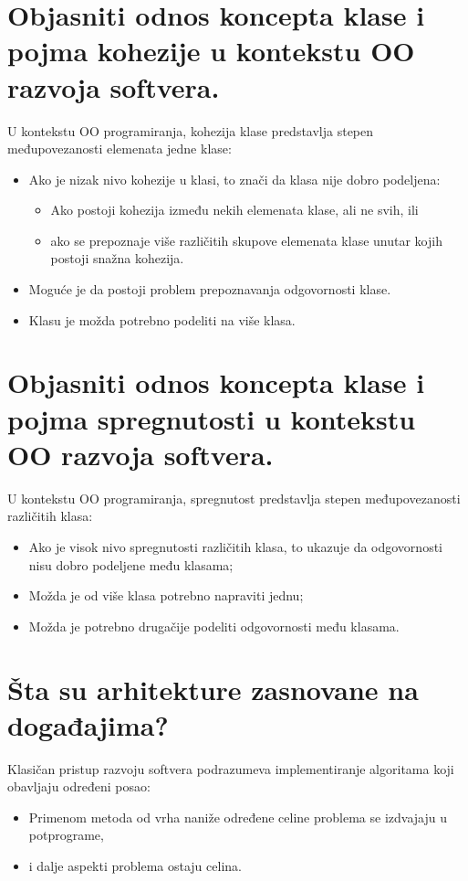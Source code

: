 \documentclass[a4paper]{article}
\begin{document}
\section{Objasniti odnos koncepta klase i pojma kohezije u kontekstu OO razvoja softvera.}
  U kontekstu OO programiranja, kohezija klase predstavlja stepen međupovezanosti elemenata jedne klase:
  \begin{itemize}
    \item Ako je nizak nivo kohezije u klasi, to znači da klasa nije dobro podeljena:
          \begin{itemize}
            \item Ako postoji kohezija između nekih elemenata klase, ali ne svih, ili
            \item ako se prepoznaje više različitih skupove elemenata klase unutar kojih postoji snažna kohezija.
          \end{itemize}
    \item Moguće je da postoji problem prepoznavanja odgovornosti klase. 
    \item Klasu je možda potrebno podeliti na više klasa.
  \end{itemize}

\section{Objasniti odnos koncepta klase i pojma spregnutosti u kontekstu OO razvoja softvera.}
  U kontekstu OO programiranja, spregnutost predstavlja stepen međupovezanosti različitih klasa:
  \begin{itemize}
    \item Ako je visok nivo spregnutosti različitih klasa, 
          to ukazuje da odgovornosti nisu dobro podeljene među klasama;
    \item Možda je od više klasa potrebno napraviti jednu;
    \item Možda je potrebno drugačije podeliti odgovornosti među klasama.
  \end{itemize}

\section{Šta su arhitekture zasnovane na događajima?}
  Klasičan pristup razvoju softvera podrazumeva implementiranje algoritama 
  koji obavljaju određeni posao:
  \begin{itemize}
    \item Primenom metoda od vrha naniže određene celine problema se izdvajaju u potprograme,
    \item i dalje aspekti problema ostaju celina.
  \end{itemize}
\end{document}
